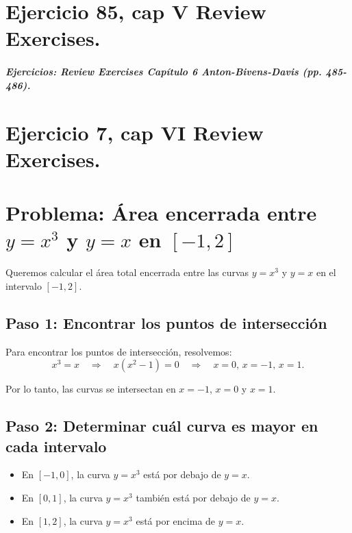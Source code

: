 \documentclass[11pt,letterpaper]{article}
\begin{document}
\section{Ejercicio 85, cap V Review Exercises.}




\subparagraph{Ejercicios: Review Exercises Capítulo 6 Anton-Bivens-Davis (pp. 485-486).}

\section{Ejercicio 7, cap VI Review Exercises.}
\section*{Problema: Área encerrada entre \( y = x^3 \) y \( y = x \) en \([-1, 2]\)}

Queremos calcular el área total encerrada entre las curvas \( y = x^3 \) y \( y = x \) en el intervalo \([-1, 2]\). 

\subsection*{Paso 1: Encontrar los puntos de intersección}
Para encontrar los puntos de intersección, resolvemos:
\[
x^3 = x \quad \Rightarrow \quad x(x^2 - 1) = 0 \quad \Rightarrow \quad x = 0, \, x = -1, \, x = 1.
\]

Por lo tanto, las curvas se intersectan en \( x = -1 \), \( x = 0 \) y \( x = 1 \).

\subsection*{Paso 2: Determinar cuál curva es mayor en cada intervalo}
\begin{itemize}
 \item En \([-1, 0]\), la curva \( y = x^3 \) está por debajo de \( y = x \).
 \item En \([0, 1]\), la curva \( y = x^3 \) también está por debajo de \( y = x \).
 \item En \([1, 2]\), la curva \( y = x^3 \) está por encima de \( y = x \).
\end{itemize}
\end{document}
